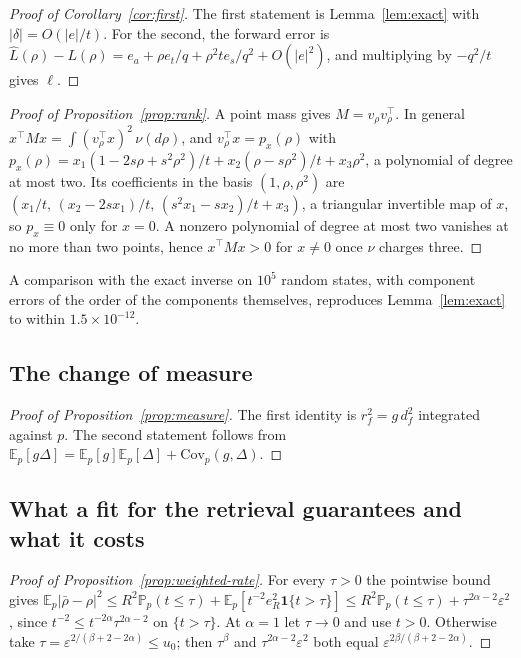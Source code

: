 \documentclass[11pt]{article}
\theoremstyle{remark}
\newcommand{\E}{\mathbb{E}}
\newcommand{\Prob}{\mathbb{P}}
\newcommand{\1}{\mathbf{1}}
\begin{document}
\begin{proof}[Proof of Corollary~\ref{cor:first}]
The first statement is Lemma~\ref{lem:exact} with $|\delta|=O(|e|/t)$. For the second, the forward error is
$\hat L(\rho)-L(\rho)=e_a+\rho e_t/q+\rho^2 t e_s/q^2+O(|e|^2)$, and multiplying by $-q^2/t$ gives $\ell$.
\end{proof}

\begin{proof}[Proof of Proposition~\ref{prop:rank}]
A point mass gives $M=v_\rho v_\rho^\top$. In general $x^\top Mx=\int(v_\rho^\top x)^2\,\nu(d\rho)$, and
$v_\rho^\top x=p_x(\rho)$ with $p_x(\rho)=x_1(1-2s\rho+s^2\rho^2)/t+x_2(\rho-s\rho^2)/t+x_3\rho^2$, a polynomial of
degree at most two. Its coefficients in the basis $(1,\rho,\rho^2)$ are $(x_1/t,\,(x_2-2sx_1)/t,\,(s^2x_1-sx_2)/t+x_3)$,
a triangular invertible map of $x$, so $p_x\equiv0$ only for $x=0$. A nonzero polynomial of degree at most two
vanishes at no more than two points, hence $x^\top Mx>0$ for $x\neq0$ once $\nu$ charges three.
\end{proof}

A comparison with the exact inverse on $10^5$ random states, with component errors of the order of the components
themselves, reproduces Lemma~\ref{lem:exact} to within $1.5\times10^{-12}$.

\subsection{The change of measure}

\begin{proof}[Proof of Proposition~\ref{prop:measure}]
The first identity is $r_f^2=g\,d_f^2$ integrated against $p$. The second statement follows from
$\E_p[g\Delta]=\E_p[g]\E_p[\Delta]+\mathrm{Cov}_p(g,\Delta)$.
\end{proof}

\subsection{What a fit for the retrieval guarantees and what it costs}

\begin{proof}[Proof of Proposition~\ref{prop:weighted-rate}]
For every $\tau>0$ the pointwise bound gives $\E_p|\bar\rho-\rho|^2\le R^2\Prob_p(t\le\tau)+\E_p[t^{-2}e_R^2\1\{t>\tau\}]
\le R^2\Prob_p(t\le\tau)+\tau^{2\alpha-2}\varepsilon^2$, since $t^{-2}\le t^{-2\alpha}\tau^{2\alpha-2}$ on $\{t>\tau\}$.
At $\alpha=1$ let $\tau\to0$ and use $t>0$. Otherwise take $\tau=\varepsilon^{2/(\beta+2-2\alpha)}\le u_0$; then
$\tau^\beta$ and $\tau^{2\alpha-2}\varepsilon^2$ both equal $\varepsilon^{2\beta/(\beta+2-2\alpha)}$.
\end{proof}
\end{document}
